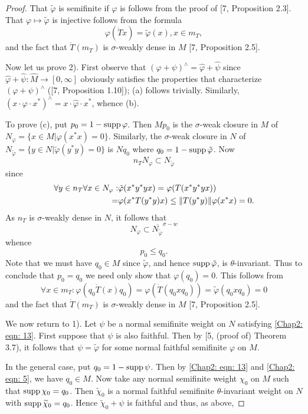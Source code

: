 \begin{proof}
    That $\tilde{\varphi}$ is semifinite if $\varphi$ is follows from the proof of [7, Proposition 2.3]. That $\varphi\mapsto \tilde{\varphi}$ is injective follows from the formula
    \[
        \varphi(\dot{T}x)=\tilde{\varphi}(x),x\in m_T,
    \]
    and the fact that $\dot{T}(m_T)$ is $\sigma$-weakly dense in $M$ [7, Proposition 2.5]. \par
    Now let us prove 2). First observe that $(\varphi+\psi)^\wedge=\hat{\varphi}+\hat{\psi}$ since $\hat{\varphi}+\hat{\psi}:\hat{M}\to [0,\infty]$ obviously satisfies the properties that characterize $(\varphi+\psi)^\wedge$ ([7, Proposition 1.10]); (a)
    follows trivially. Similarly, $(x\cdot \varphi\cdot x^*)^\wedge=x\cdot \hat{\varphi}\cdot x^*$, whence (b).\par
    To prove (c), put $p_0=1-\operatorname{supp} \varphi$. Then $Mp_0$ is the $\sigma$-weak closure in $M$ of $N_\varphi=\{x\in M|\varphi(x^*x)=0\}$. Similarly, the $\sigma$-weak closure in $N$ of $N_{\tilde{\varphi}}=\{y\in N|\tilde{\varphi}(y^*y)=0\}$ is $Nq_0$ where $q_0=1-\operatorname{supp} \tilde{\varphi}$. Now
    \[
        n_TN_\varphi\subset N_{\tilde{\varphi}}
    \]
    since
    \[
        \begin{split}
            \forall y\in n_T\forall x\in N_\varphi:&\tilde{\varphi}(x^*y^*yx)=\varphi(T(x^*y^*yx))\\
            =&\varphi(x^*T(y^*y)x)\leq \norm{T(y^*y)}\varphi(x^*x)=0.
        \end{split}
    \]
    As $n_T$ is $\sigma$-weakly dense in $N$, it follows that
    \[
        N_\varphi\subset \overline{N_{\tilde{\varphi}}}^{\sigma-w}
    \]
    whence
    \[
        p_0\leq q_0.
    \]
    Note that we must have $q_0\in M$ since $\tilde{\varphi}$, and hence $\operatorname{supp} \tilde{\varphi}$, is $\theta$-invariant. Thus to conclude that $p_0=q_0$ we need only show that $\varphi(q_0)=0$. This follows from
    \[
        \forall x\in m_T:\varphi(q_0\dot{T}(x)q_0)=\varphi(\dot{T}(q_0xq_0))=\tilde{\varphi}(q_0xq_0)=0
    \]
    and the fact that $\dot{T}(m_T)$ is $\sigma$-weakly dense in $M$ [7, Proposition 2.5].\par
    We now return to 1). Let $\psi$ be a normal semifinite weight on
    $N$ satisfying \eqref{Chap2: eqn: 13}. First suppose that $\psi$ is also faithful. Then by [5, (proof of) Theorem 3.7), it follows that $\psi=\tilde{\varphi}$ for some normal faithful semifinite $\varphi$ on $M$.\par
    In the general case, put $q_0=1-\operatorname{supp} \psi$. Then by \eqref{Chap2: eqn: 13} and \eqref{Chap2: eqn: 5}, we have $q_0\in M$. Now take any normal semifinite weight $\chi_0$ on $M$ such that $\operatorname{supp}\chi_0=q_0$. Then $\widetilde{\chi}_0$ is a normal faithful semifinite $\theta$-invariant weight on $N$ with $\operatorname{supp} \widetilde{\chi}_0=q_0$. Hence $\widetilde{\chi}_0+\psi$ is faithful and thus, as above,

\end{proof}
